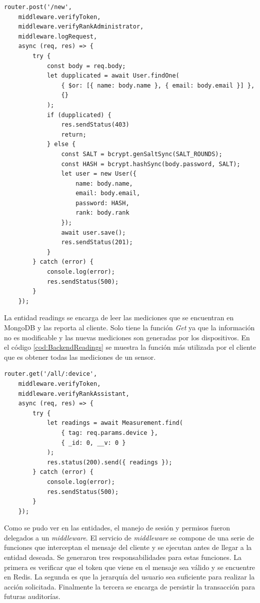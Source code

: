 \begin{lstlisting}[label=cod:BackendUsers,caption=Creación de usuario de la entidad users]
router.post('/new',
    middleware.verifyToken,
    middleware.verifyRankAdministrator,
    middleware.logRequest,
    async (req, res) => {
        try {
            const body = req.body;
            let dupplicated = await User.findOne(
                { $or: [{ name: body.name }, { email: body.email }] },
                {}
            );
            if (dupplicated) {
                res.sendStatus(403)
                return;
            } else {
                const SALT = bcrypt.genSaltSync(SALT_ROUNDS);
                const HASH = bcrypt.hashSync(body.password, SALT);
                let user = new User({
                    name: body.name,
                    email: body.email,
                    password: HASH,
                    rank: body.rank
                });
                await user.save();
                res.sendStatus(201);
            }
        } catch (error) {
            console.log(error);
            res.sendStatus(500);
        }
    });
\end{lstlisting}

La entidad readings se encarga de leer las mediciones que se encuentran en MongoDB y las reporta al cliente.
Solo tiene la función \emph{Get} ya que la información no es modificable y las nuevas mediciones son generadas por los dispositivos.
En el código \ref{cod:BackendReadings} se muestra la función más utilizada por el cliente que es obtener todas las mediciones de un sensor.

\begin{lstlisting}[label=cod:BackendReadings,caption=Función más utilizada de la entidad readings]
router.get('/all/:device',
    middleware.verifyToken,
    middleware.verifyRankAssistant,
    async (req, res) => {
        try {
            let readings = await Measurement.find(
                { tag: req.params.device },
                { _id: 0, __v: 0 }
            );
            res.status(200).send({ readings });
        } catch (error) {
            console.log(error);
            res.sendStatus(500);
        }
    });
\end{lstlisting}

Como se pudo ver en las entidades, el manejo de sesión y permisos fueron delegados a un \emph{middleware}.
El servicio de \emph{middleware} se compone de una serie de funciones que interceptan el mensaje del cliente y se ejecutan antes de llegar a la entidad deseada.
Se generaron tres responsabilidades para estas funciones.
La primera es verificar que el token que viene en el mensaje sea válido y se encuentre en Redis.
La segunda es que la jerarquía del usuario sea suficiente para realizar la acción solicitada.
Finalmente la tercera se encarga de persistir la transacción para futuras auditorías.

